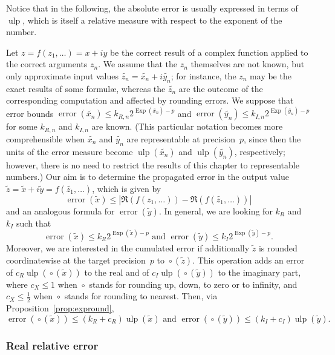 \documentclass [11pt]{article}
\newcommand {\corr}[1]{{#1}}
\newcommand {\appro}[1]{\widetilde {#1}}
\newcommand {\Ulp}{{\operatorname {ulp}}}
\DeclareMathOperator{\Exp}{\operatorname {Exp}}
\newcommand{\error}{\operatorname {error}}
\newcommand {\round}{\operatorname {\circ}}
\renewcommand {\leq}{\leqslant}
\begin{document}
Notice that in the following, the absolute error is usually expressed in terms
of $\Ulp$, which is itself a relative measure with respect to the exponent of
the number.

Let $\corr z = f (\corr {z_1}, \ldots) = \corr x + i \corr y$ be the correct
result of a complex function applied to the correct arguments $\corr {z_n}$.
We assume that the $\corr {z_n}$ themselves are not known, but only
approximate input values $\appro {z_n} = \appro {x_n} + i \appro {y_n}$;
for instance, the $\corr {z_n}$ may be the exact results of some formul\ae,
whereas the $\appro {z_n}$ are the outcome of the corresponding computation
and affected by rounding errors. We suppose that error bounds
$\error (\appro {x_n}) \leq k_{R, n} 2^{\Exp (\appro {x_n}) - p}$
and $\error (\appro {y_n}) \leq k_{I, n} 2^{\Exp (\appro {y_n}) - p}$ for
some $k_{R, n}$ and $k_{I, n}$ are known. (This particular notation
becomes more comprehensible when $\appro {x_n}$ and $\appro {y_n}$ are
representable at precision~$p$, since then the units of the error measure
become $\Ulp (\appro {x_n})$ and $\Ulp (\appro {y_n})$, respectively;
however, there is no need to restrict the results of this chapter to
representable numbers.)
Our aim is to determine the propagated error in the output value
$\appro z = \appro x + i \appro y = f (\appro {z_1}, \ldots)$, which is given by
\begin {equation}
\label {eq:properror}
\error (\appro x)
\leq | \Re (f (\corr {z_1}, \ldots)) - \Re (f (\appro {z_1}, \ldots)) |
\end {equation}
and an analogous formula for $\error (\appro y)$. In general,
we are looking for $k_R$ and $k_I$ such that
\[
\error (\appro x) \leq k_R 2^{\Exp (\appro x) - p}
\text { and }
\error (\appro y) \leq k_I 2^{\Exp (\appro y) - p}.
\]
Moreover, we are interested in the cumulated error if additionally
$\appro z$ is rounded coordinatewise at the target precision~$p$
to $\round (\appro z)$. This operation adds an error of
$c_R \Ulp (\round (\appro x))$ to the real and of
$c_I \Ulp (\round (\appro y))$ to the imaginary part, where
$c_X \leq 1$ when $\round$ stands for rounding up, down, to zero or
to infinity, and $c_X \leq \frac {1}{2}$ when $\round$ stands for
rounding to nearest.
Then, via Proposition~\ref {prop:expround},
\[
\error (\round (\appro x)) \leq (k_R + c_R) \Ulp (\appro x)
\text { and }
\error (\round (\appro y)) \leq (k_I + c_I) \Ulp (\appro y).
\]


\subsubsection {Real relative error}
\end{document}
